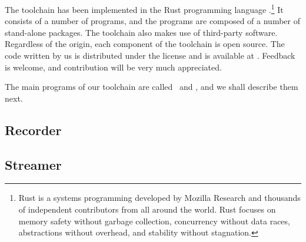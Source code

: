 The toolchain has been implemented in the Rust programming language
\cite{rust}.\footnote{Rust is a systems programming developed by Mozilla
Research and thousands of independent contributors from all around the world.
Rust focuses on memory safety without garbage collection, concurrency without
data races, abstractions without overhead, and stability without stagnation.} It
consists of a number of programs, and the programs are composed of a number of
stand-alone packages. The toolchain also makes use of third-party software.
Regardless of the origin, each component of the toolchain is open source. The
code written by us is distributed under the  license \cite{mit} and is
available at \cite{sources}. Feedback is welcome, and contribution will be very
much appreciated.

The main programs of our toolchain are called \recorder\ and \streamer, and we
shall describe them next.

\subsection{Recorder}


\subsection{Streamer}

